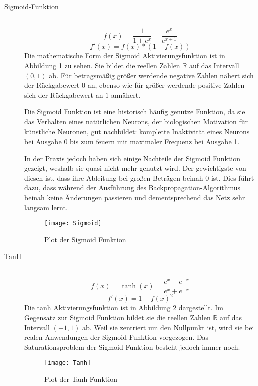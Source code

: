 \begin{description}
	\item[Sigmoid-Funktion] \hfill \\
		\begin{equation}
			f(x) = \frac{1}{1 + e^x} = \frac{e^x}{e^{x + 1}}
			\label{func:Sigmoid}
		\end{equation}
		\begin{equation}
			f'(x) = f(x) * (1 - f(x))
		\end{equation}
		Die mathematische Form der Sigmoid Aktivierungsfunktion ist in Abbildung \ref{sigmoidFunc} zu sehen.
		Sie bildet die reellen Zahlen \(\mathbb{R}\) auf das Intervall \((0,1)\) ab. 
		Für betragsmäßig größer werdende negative Zahlen nähert sich der Rückgabewert \(0\) an,
		ebenso wie für größer werdende positive Zahlen sich der Rückgabewert an \(1\) annähert.

		Die Sigmoid Funktion ist eine historisch häufig genutze Funktion, da sie das Verhalten eines natürlichen Neurons,
		der biologischen Motivation für künstliche Neuronen, gut nachbildet:
		komplette Inaktivität eines Neurons bei Ausgabe 0 bis zum feuern mit maximaler Frequenz bei Ausgabe 1.

		In der Praxis jedoch haben sich einige Nachteile der Sigmoid Funktion gezeigt, weshalb sie quasi nicht mehr genutzt wird.
		Der gewichtigste von diesen ist, dass ihre Ableitung bei großen Beträgen beinah \(0\) ist.
		Dies führt dazu, dass während der Ausführung des Backpropagation-Algorithmus beinah keine Änderungen passieren und dementsprechend das Netz sehr langsam lernt.
		
		\begin{figure}
			\centering
			\texttt{[image: Sigmoid]}
			\caption{Plot der Sigmoid Funktion}
			\label{sigmoidFunc}
		\end{figure}
		  


	\item[TanH] \hfill \\
		\begin{equation}
			f(x) = \tanh(x) = \frac{e^x - e^{-x}}{e^x + e^{-x}}
		\end{equation}
		\begin{equation}
			f'(x) = 1 - f(x)^2
		\end{equation}
		Die tanh Aktivierungsfunktion ist in Abbildung \ref{tanhfunction} dargestellt.
		Im Gegensatz zur Sigmoid Funktion bildet sie die reellen Zahlen \(\mathbb{R}\) auf das Intervall \((-1, 1)\) ab.
		Weil sie zentriert um den Nullpunkt ist, wird sie bei realen Anwendungen der Sigmoid Funktion vorgezogen.
		Das Saturationsproblem der Sigmoid Funktion besteht jedoch immer noch.
		\begin{figure}
			\centering
			\texttt{[image: Tanh]}
			\caption{Plot der Tanh Funktion}
			\label{tanhfunction}
		\end{figure}
	

\end{description}
